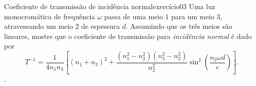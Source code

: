 \begin{exercício}{Coeficiente de transmissão de incidência normal}{exercício03}
    Uma luz monocromática de frequência \(\omega\) passa de uma meio \(1\) para um meio \(3\), atravessando um meio \(2\) de espessura \(d\). Assumindo que os três meios são lineares, mostre que o coeficiente de transmissão para \emph{incidência normal} é dado por
    \begin{equation*}
        T^{-1} = \frac{1}{4n_1n_3} \left[(n_1 + n_3)^2 + \frac{(n_1^2 - n_2^2)(n_3^2 - n_2^2)}{n_2^2}\sin^2\left(\frac{n_2\omega d}{c}\right)\right].
    \end{equation*}
    .
\end{exercício}
